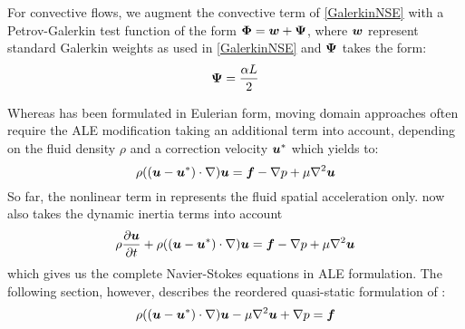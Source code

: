 For convective flows, we augment the convective term of \eqref{GalerkinNSE} with a Petrov-Galerkin test function of the form $\vect{\Phi}=\vect{w}+\vect{\Psi}$, where $\vect{w}$ represent standard Galerkin weights as used in \eqref{GalerkinNSE} and $\vect{\Psi}$ takes the form:
\begin{equation}
 \label{PetrovGalerkinTest}
  \vect{\Psi}=\frac{\alpha{L}}{2}
\end{equation}


Whereas  has been formulated in Eulerian form, moving domain approaches often require the ALE modification taking an additional term into account, depending on the fluid density $\rho$ and a correction velocity $\vect{u}^*$ which yields to:
\begin{equation}
    \rho((\vect{u}-\vect{u}^*)\cdot\grad)\vect{u}=\vect{f}-\grad{p}+\mu\laplacian{\vect{u}}
  \label{eqn:NavierStokesequationALE}
\end{equation}
So far, the nonlinear term in  represents the fluid spatial acceleration only.  now also takes the dynamic inertia terms into account
\begin{equation}
    \rho\delby{\vect{u}}{t}+ \rho((\vect{u}-\vect{u}^*)\cdot\grad)\vect{u}=\vect{f}-\grad{p}+\mu\laplacian{\vect{u}}
  \label{eqn:NavierStokesequation2}
\end{equation}
which gives us the complete Navier-Stokes equations in ALE formulation.
The following section, however, describes the reordered quasi-static formulation of  :
\begin{equation}
\rho((\vect{u}-\vect{u}^*)\cdot\grad)\vect{u}-\mu\laplacian{\vect{u}}+\grad{p}=\vect{f}
  \label{eqn:NavierStokesequationALE2}
\end{equation}


